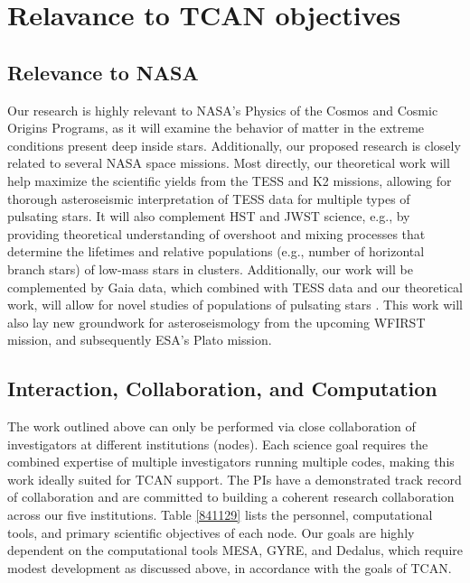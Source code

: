
\section{Relavance to TCAN objectives}

\subsection{Relevance to NASA}


Our research is highly relevant to NASA's Physics of the Cosmos and Cosmic Origins Programs, as it will examine the behavior of matter in the extreme conditions present deep inside stars. Additionally, our proposed research is closely related to several NASA space missions. Most directly, our theoretical work will help maximize the scientific yields from the TESS and K2 missions, allowing for thorough asteroseismic interpretation of TESS data for multiple types of pulsating stars. It will also complement HST and JWST science, e.g., by providing theoretical understanding of overshoot and mixing processes that determine the lifetimes and relative populations (e.g., number of horizontal branch stars) of low-mass stars in clusters. Additionally, our work will be complemented by Gaia data, which combined with TESS data and our theoretical work, will allow for novel studies of populations of pulsating stars . This work will also lay new groundwork for asteroseismology from the upcoming WFIRST mission, and subsequently ESA's Plato mission. 


\subsection{Interaction, Collaboration, and Computation}

The work outlined above can only be performed via close collaboration of investigators at different institutions (nodes). Each science goal requires the combined expertise of multiple investigators running multiple codes, making this work ideally suited for TCAN support. The PIs have a demonstrated track record of collaboration and are committed to building a coherent research collaboration across our five institutions. Table \ref{841129} lists the personnel, computational tools, and primary scientific objectives of each node. Our goals are highly dependent on the computational tools MESA, GYRE, and Dedalus, which require modest development as discussed above, in accordance with the goals of TCAN.



